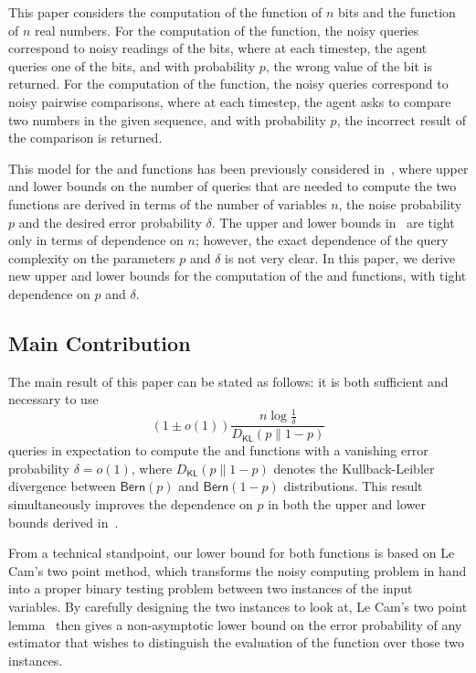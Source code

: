 \documentclass[journal, onecolumn]{IEEEtran}
\theoremstyle{plain}
\theoremstyle{definition}
\theoremstyle{remark}
\begin{document}
This paper considers the computation of the \orn function of $n$ bits and the \maxn function of $n$ real numbers. For the computation of the \orn function, the noisy queries correspond to noisy readings of the bits, where at each timestep, the agent queries one of the bits, and with probability $p$, the wrong value of the bit is returned. For the computation of the \maxn function, the noisy queries correspond to noisy pairwise comparisons, where at each timestep, the agent asks to compare two numbers in the given sequence, and with probability $p$, the incorrect result of the comparison is returned. 

This model for the \orn and \maxn functions has been previously considered in~\citep{feige1994computing}, where upper and lower bounds on the number of queries that are needed to compute the two functions are derived in terms of the number of variables $n$, the noise probability $p$ and the desired error probability $\delta$. The upper and lower bounds in~\citep{feige1994computing} are tight only in terms of dependence on $n$; however, the exact dependence of the query complexity on the parameters $p$ and $\delta$ is not very clear. In this paper, we derive new upper and lower bounds for the computation of the \orn and \maxn functions, with tight dependence on $p$ and $\delta$.

\subsection{Main Contribution}
The main result of this paper can be stated as follows: it is both sufficient and necessary to use
\[
    (1 \pm o(1)) \frac{n\log \frac{1}{\delta}}{D_{\mathsf{KL}}(p \| 1-p)}
\]
queries in expectation to compute the \orn and \maxn functions with a vanishing error probability $\delta = o(1)$, where $D_{\mathsf{KL}}(p \| 1-p)$ denotes the Kullback-Leibler divergence between $\mathsf{Bern}(p)$ and $\mathsf{Bern}(1-p)$ distributions. This result simultaneously improves the dependence on $p$ in both the upper and lower bounds derived in~\citep{feige1994computing}. 

From a technical standpoint, our lower bound for both functions is based on Le Cam's two point method, which transforms the noisy computing problem in hand into a proper binary testing problem between two instances of the input variables. By carefully designing the two instances to look at, Le Cam's two point lemma~\citep{yu1997assouad} then gives a non-asymptotic lower bound on the error probability of any estimator that wishes to distinguish the evaluation of the function over those two instances. 
\end{document}
